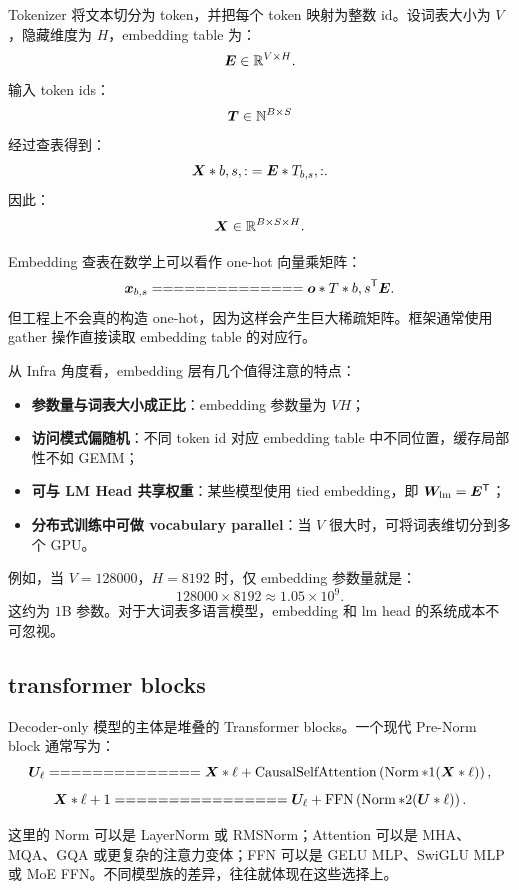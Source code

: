 Tokenizer 将文本切分为 token，并把每个 token 映射为整数 id。设词表大小为 $V$，隐藏维度为 $H$，embedding table 为：
\[
\bm{E}\in\mathbb{R}^{V\times H}.
\]
输入 token ids：
\[
\bm{T}\in\mathbb{N}^{B\times S}
\]
经过查表得到：
\[
\bm{X}*{b,s,:}=\bm{E}*{T_{b,s},:}.
\]
因此：
\[
\bm{X}\in\mathbb{R}^{B\times S\times H}.
\]

Embedding 查表在数学上可以看作 one-hot 向量乘矩阵：
\[
\vect{x}_{b,s}
==============

\vect{o}*{T*{b,s}}^{\mathsf{T}}\mat{E}.
\]
但工程上不会真的构造 one-hot，因为这样会产生巨大稀疏矩阵。框架通常使用 gather 操作直接读取 embedding table 的对应行。

从 Infra 角度看，embedding 层有几个值得注意的特点：

\begin{itemize}
\item \textbf{参数量与词表大小成正比}：embedding 参数量为 $VH$；
\item \textbf{访问模式偏随机}：不同 token id 对应 embedding table 中不同位置，缓存局部性不如 GEMM；
\item \textbf{可与 LM Head 共享权重}：某些模型使用 tied embedding，即 $\bm{W}_{\mathrm{lm}}=\bm{E}^{\mathsf{T}}$；
\item \textbf{分布式训练中可做 vocabulary parallel}：当 $V$ 很大时，可将词表维切分到多个 GPU。
\end{itemize}

例如，当 $V=128000$，$H=8192$ 时，仅 embedding 参数量就是：
\[
128000\times 8192\approx 1.05\times 10^9.
\]
这约为 $1$B 参数。对于大词表多语言模型，embedding 和 lm head 的系统成本不可忽视。

\subsection{transformer blocks}
\label{subsec:transformer-blocks}

Decoder-only 模型的主体是堆叠的 Transformer blocks。一个现代 Pre-Norm block 通常写为：
\[
\mat{U}_{\ell}
==============

\mat{X}*{\ell}
+
\operatorname{CausalSelfAttention}
\left(
\operatorname{Norm}*1(\mat{X}*{\ell})
\right),
\]
\[
\mat{X}*{\ell+1}
================

\mat{U}_{\ell}
+
\operatorname{FFN}
\left(
\operatorname{Norm}*2(\mat{U}*{\ell})
\right).
\]

这里的 Norm 可以是 LayerNorm 或 RMSNorm；Attention 可以是 MHA、MQA、GQA 或更复杂的注意力变体；FFN 可以是 GELU MLP、SwiGLU MLP 或 MoE FFN。不同模型族的差异，往往就体现在这些选择上。

